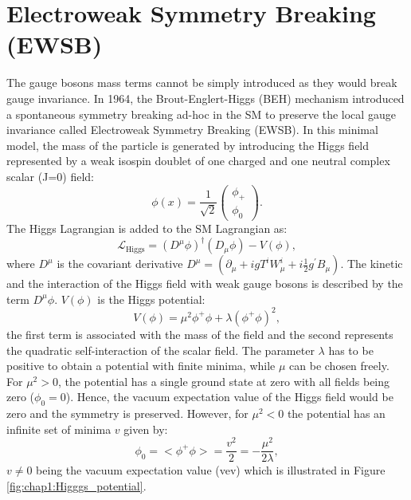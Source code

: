 \section{Electroweak Symmetry Breaking (EWSB)}
\label{chap1:EWSB}
The gauge bosons mass terms cannot be simply introduced as they would break gauge invariance. In 1964, the Brout-Englert-Higgs (BEH) mechanism introduced a spontaneous symmetry breaking ad-hoc in the SM to preserve the local gauge invariance \cite{Englert} called Electroweak Symmetry Breaking (EWSB). In this minimal model, the mass of the particle is generated by introducing the Higgs field represented by a weak isospin doublet of one charged and one neutral complex scalar (J=0) field:
\begin{equation}
    \phi(x)=\frac{1}{\sqrt{2}}\left(\begin{array}{c}
\phi_{+} \\
\phi_{0}
\end{array}\right).
\end{equation}
The Higgs Lagrangian is added to the SM Lagrangian as:
\begin{equation}
    \mathcal{L}_{\mathrm{Higgs}}=\left(D^{\mu} \phi\right)^{\dagger}\left(D_{\mu} \phi\right)-V(\phi),
\end{equation}
where $D^\mu$ is the covariant derivative $D^\mu =\left(\partial_{\mu}+i g T^{i} W_{\mu}^{i}+i \frac{1}{2} g^{\prime} B_{\mu}\right)$. The kinetic and the interaction of the Higgs field with weak gauge bosons is described by the term $D^\mu\phi$. $V(\phi)$ is the Higgs potential:
\begin{equation}
    V(\phi)=\mu^{2} \phi^{+} \phi+\lambda\left(\phi^{+} \phi\right)^{2},
\end{equation}
the first term is associated with the mass of the field and the second represents the quadratic self-interaction of the scalar field. The parameter $\lambda$ has to be positive to obtain a potential with finite minima, while $\mu$ can be chosen freely. For $\mu^{2} > 0$, the potential has a single ground state at zero with all fields being zero ($\phi_0 = 0$). Hence, the vacuum expectation value of the Higgs field would be zero and the symmetry is preserved. However, for $\mu^{2} < 0$ the potential has an infinite set of minima $v$ given by:
\begin{equation}
    \phi_{0}=<\phi^{+} \phi>=\frac{v^{2}}{2}=-\frac{\mu^{2}}{2 \lambda},
\end{equation}
$v\neq0$ being the vacuum expectation value (vev) which is illustrated in Figure \ref{fig:chap1:Higggs_potential}.
